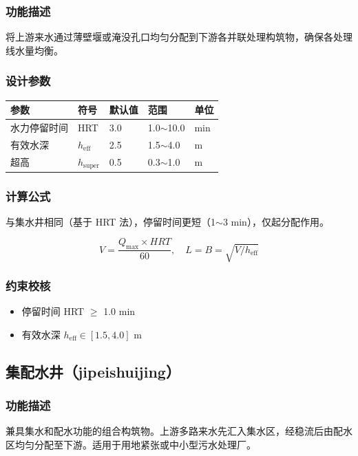 \documentclass[12pt,a4paper]{ctexart}
\begin{document}
\subsubsection{功能描述}
将上游来水通过薄壁堰或淹没孔口均匀分配到下游各并联处理构筑物，确保各处理线水量均衡。

\subsubsection{设计参数}
\begin{table}[h]
\centering
\begin{tabular}{@{}lllll@{}}
\toprule
参数 & 符号 & 默认值 & 范围 & 单位 \\
\midrule
水力停留时间 & HRT & 3.0 & 1.0$\sim$10.0 & min \\
有效水深     & $h_{\text{eff}}$ & 2.5 & 1.5$\sim$4.0 & m \\
超高         & $h_{\text{super}}$ & 0.5 & 0.3$\sim$1.0 & m \\
\bottomrule
\end{tabular}
\end{table}

\subsubsection{计算公式}

与集水井相同（基于 HRT 法），停留时间更短（1$\sim$3 min），仅起分配作用。

\begin{equation}
    V = \frac{Q_{\max} \times HRT}{60}, \quad
    L = B = \sqrt{V / h_{\text{eff}}}
\end{equation}

\subsubsection{约束校核}
\begin{itemize}[itemsep=0pt]
    \item 停留时间 HRT $\geq$ 1.0 min
    \item 有效水深 $h_{\text{eff}} \in [1.5, 4.0]$ m
\end{itemize}

\subsection{集配水井（jipeishuijing）}

\subsubsection{功能描述}
兼具集水和配水功能的组合构筑物。上游多路来水先汇入集水区，经稳流后由配水区均匀分配至下游。适用于用地紧张或中小型污水处理厂。
\end{document}
